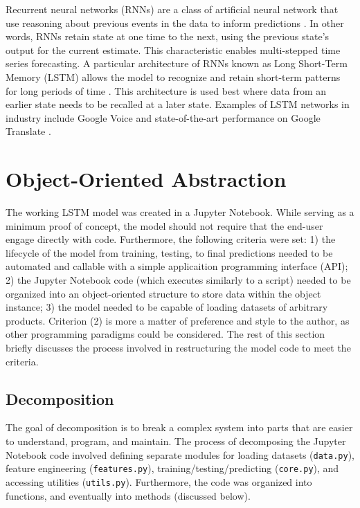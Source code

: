 \documentclass[11pt, oneside]{report}
\begin{document}
Recurrent neural networks (RNNs) are a class of artificial neural network that use reasoning about previous events in the data to inform predictions \cite{olah}. In other words, RNNs retain state at one time to the next, using the previous state's output for the current estimate. This characteristic enables multi-stepped time series forecasting. A particular architecture of RNNs known as Long Short-Term Memory (LSTM) allows the model to recognize and retain short-term patterns for long periods of time \cite{hochreiter}. This architecture is used best where data from an earlier state needs to be recalled at a later state. Examples of LSTM networks in industry include Google Voice \cite{beaufays} and state-of-the-art performance on Google Translate \cite{le}.

\section{Object-Oriented Abstraction}
The working LSTM model was created in a Jupyter Notebook. While serving as a minimum proof of concept, the model should not require that the end-user engage directly with code. Furthermore, the following criteria were set: 1) the lifecycle of the model from training, testing, to final predictions needed to be automated and callable with a simple applicaition programming interface (API); 2) the Jupyter Notebook code (which executes similarly to a script) needed to be organized into an object-oriented structure to store data within the object instance; 3) the model needed to be capable of loading datasets of arbitrary products. Criterion (2) is more a matter of preference and style to the author, as other programming paradigms could be considered. The rest of this section briefly discusses the process involved in restructuring the model code to meet the criteria.

\subsection{Decomposition}
The goal of decomposition is to break a complex system into parts that are easier to understand, program, and maintain. The process of decomposing the Jupyter Notebook code involved defining separate modules for loading datasets (\texttt{data.py}), feature engineering (\texttt{features.py}), training/testing/predicting (\texttt{core.py}), and accessing utilities (\texttt{utils.py}). Furthermore, the code was organized into functions, and eventually into methods (discussed below).
\end{document}
